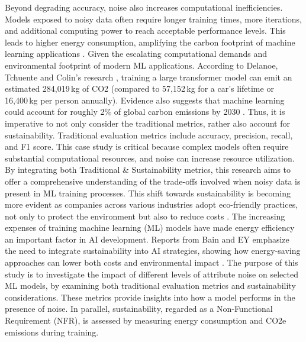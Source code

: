 \documentclass[conference]{IEEEtran}
\begin{document}
\newline
\newline
Beyond degrading accuracy, noise also increases computational inefficiencies. Models exposed to noisy data often require longer training times, more iterations, and additional computing power to reach acceptable performance levels. This leads to higher energy consumption, amplifying the carbon footprint of machine learning applications \cite{sciencedirect}.
\newline
\newline
Given the escalating computational demands and environmental footprint of modern ML applications. According to Delanoe, Tchuente and Colin’s research \cite{DELAN}, training a large transformer model can emit an estimated 284,019 kg of CO2 (compared to 57,152 kg for a car’s lifetime or 16,400 kg per person annually). Evidence also suggests that machine learning could account for roughly 2\% of global carbon emissions by 2030 \cite{carbon_emissions}.
Thus, it is imperative to not only consider the traditional metrics, rather also account for sustainability. Traditional evaluation metrics include accuracy, precision, recall, and F1 score.
\newline 
\newline
This case study is critical because complex models often require substantial computational resources, and noise can increase resource utilization. By integrating both Traditional & Sustainability metrics, this research aims to offer a comprehensive understanding of the trade-offs involved when noisy data is present in ML training processes. This shift towards sustainability is becoming more evident as companies across various industries adopt eco-friendly practices, not only to protect the environment but also to reduce costs \cite{ey_ai_sustainability}. The increasing expenses of training machine learning (ML) models have made energy efficiency an important factor in AI development. Reports from Bain and EY emphasize the need to integrate sustainability into AI strategies, showing how energy-saving approaches can lower both costs and environmental impact \cite{bain_ai_sustainability}. 
\newline
\newline
The purpose of this study is to investigate the impact of different levels of attribute noise on selected ML models, by examining both traditional evaluation metrics and sustainability considerations. These metrics provide insights into how a model performs in the presence of noise. In parallel, sustainability, regarded as a Non-Functional Requirement (NFR), is assessed by measuring energy consumption and CO2e emissions during training.
\end{document}
